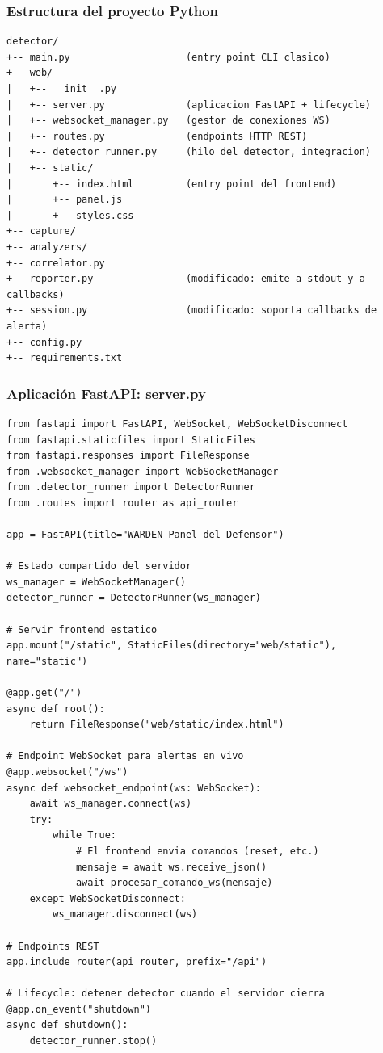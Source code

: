 \documentclass[11pt,a4paper]{article}
\begin{document}
\subsubsection{Estructura del proyecto Python}

\begin{lstlisting}
detector/
+-- main.py                    (entry point CLI clasico)
+-- web/
|   +-- __init__.py
|   +-- server.py              (aplicacion FastAPI + lifecycle)
|   +-- websocket_manager.py   (gestor de conexiones WS)
|   +-- routes.py              (endpoints HTTP REST)
|   +-- detector_runner.py     (hilo del detector, integracion)
|   +-- static/
|       +-- index.html         (entry point del frontend)
|       +-- panel.js
|       +-- styles.css
+-- capture/
+-- analyzers/
+-- correlator.py
+-- reporter.py                (modificado: emite a stdout y a callbacks)
+-- session.py                 (modificado: soporta callbacks de alerta)
+-- config.py
+-- requirements.txt
\end{lstlisting}

\subsubsection{Aplicación FastAPI: server.py}

\begin{lstlisting}
from fastapi import FastAPI, WebSocket, WebSocketDisconnect
from fastapi.staticfiles import StaticFiles
from fastapi.responses import FileResponse
from .websocket_manager import WebSocketManager
from .detector_runner import DetectorRunner
from .routes import router as api_router

app = FastAPI(title="WARDEN Panel del Defensor")

# Estado compartido del servidor
ws_manager = WebSocketManager()
detector_runner = DetectorRunner(ws_manager)

# Servir frontend estatico
app.mount("/static", StaticFiles(directory="web/static"), name="static")

@app.get("/")
async def root():
    return FileResponse("web/static/index.html")

# Endpoint WebSocket para alertas en vivo
@app.websocket("/ws")
async def websocket_endpoint(ws: WebSocket):
    await ws_manager.connect(ws)
    try:
        while True:
            # El frontend envia comandos (reset, etc.)
            mensaje = await ws.receive_json()
            await procesar_comando_ws(mensaje)
    except WebSocketDisconnect:
        ws_manager.disconnect(ws)

# Endpoints REST
app.include_router(api_router, prefix="/api")

# Lifecycle: detener detector cuando el servidor cierra
@app.on_event("shutdown")
async def shutdown():
    detector_runner.stop()
\end{lstlisting}
\end{document}
